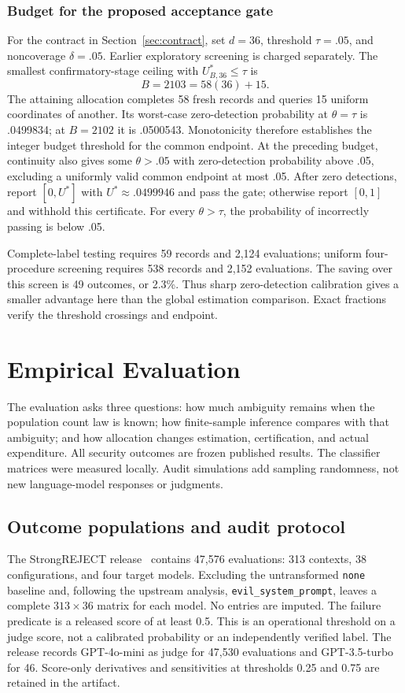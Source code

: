 \documentclass[conference]{IEEEtran}
\begin{document}
\subsubsection{Budget for the proposed acceptance gate}\label{sec:decision}
For the contract in Section~\ref{sec:contract}, set $d=36$, threshold $\tau=.05$, and noncoverage $\delta=.05$. Earlier exploratory screening is charged separately. The smallest confirmatory-stage ceiling with $U^*_{B,36}\leq\tau$ is
\[
 B=2103=58(36)+15.
\]
The attaining allocation completes 58 fresh records and queries 15 uniform coordinates of another. Its worst-case zero-detection probability at $\theta=\tau$ is .0499834; at $B=2102$ it is .0500543. Monotonicity therefore establishes the integer budget threshold for the common endpoint. At the preceding budget, continuity also gives some $\theta>.05$ with zero-detection probability above .05, excluding a uniformly valid common endpoint at most .05. After zero detections, report $[0,U^*]$ with $U^*\approx .0499946$ and pass the gate; otherwise report $[0,1]$ and withhold this certificate. For every $\theta>\tau$, the probability of incorrectly passing is below .05.

Complete-label testing requires 59 records and 2,124 evaluations; uniform four-procedure screening requires 538 records and 2,152 evaluations. The saving over this screen is 49 outcomes, or 2.3\%. Thus sharp zero-detection calibration gives a smaller advantage here than the global estimation comparison. Exact fractions verify the threshold crossings and endpoint.

\section{Empirical Evaluation}\label{sec:experiments}
The evaluation asks three questions: how much ambiguity remains when the population count law is known; how finite-sample inference compares with that ambiguity; and how allocation changes estimation, certification, and actual expenditure. All security outcomes are frozen published results. The classifier matrices were measured locally. Audit simulations add sampling randomness, not new language-model responses or judgments.

\subsection{Outcome populations and audit protocol}
The StrongREJECT release~\cite{strong,strongdata} contains 47,576 evaluations: 313 contexts, 38 configurations, and four target models. Excluding the untransformed \texttt{none} baseline and, following the upstream analysis, \texttt{evil\_system\_prompt}, leaves a complete $313\times36$ matrix for each model. No entries are imputed. The failure predicate is a released score of at least 0.5. This is an operational threshold on a judge score, not a calibrated probability or an independently verified label. The release records GPT-4o-mini as judge for 47,530 evaluations and GPT-3.5-turbo for 46. Score-only derivatives and sensitivities at thresholds 0.25 and 0.75 are retained in the artifact.
\end{document}
